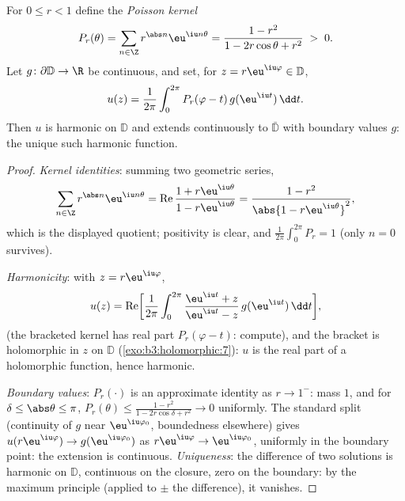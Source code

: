 \begin{theorem}\label{thm:b3:conformal:poisson}
For $0 \leq r < 1$ define the \emph{Poisson
kernel}
\[
P_r(\theta) = \sum_{n\in\Z}r^{\abs n}\eu^{\iu n\theta}
= \frac{1 - r^2}{1 - 2r\cos\theta + r^2} \;>\; 0 .
\]
Let $g \colon \partial\mathbb D \to \R$ be continuous, and
set, for $z = r\eu^{\iu\varphi} \in \mathbb D$,
\[
u(z) = \frac1{2\pi}\int_0^{2\pi}
P_r(\varphi - t)\,g(\eu^{\iu t})\,\dd t .
\]
Then $u$ is harmonic on $\mathbb D$ and extends continuously
to $\bar{\mathbb D}$ with boundary values $g$: the unique such
harmonic function.
\end{theorem}

\begin{proof}
\emph{Kernel identities}: summing two geometric series,
\[
\sum_{n\in\Z}r^{\abs n}\eu^{\iu n\theta}
= \operatorname{Re}\frac{1 + r\eu^{\iu\theta}}{1 -
r\eu^{\iu\theta}}
= \frac{1 - r^2}{\abs{1 - r\eu^{\iu\theta}}^2},
\]
which is the displayed quotient; positivity is clear, and
$\frac1{2\pi}\int_0^{2\pi}P_r = 1$ (only $n = 0$ survives).

\emph{Harmonicity}: with $z = r\eu^{\iu\varphi}$,
\[
u(z) = \operatorname{Re}\biggl[\frac1{2\pi}\int_0^{2\pi}
\frac{\eu^{\iu t} + z}{\eu^{\iu t} - z}\,
g(\eu^{\iu t})\,\dd t\biggr],
\]
(the bracketed kernel has real part $P_r(\varphi - t)$:
compute), and the bracket is holomorphic in $z$ on $\mathbb D$
(\cref{exo:b3:holomorphic:7}): $u$ is the real part of a
holomorphic function, hence harmonic.

\emph{Boundary values}: $P_r(\cdot)$ is an approximate
identity as $r \to 1^-$: mass $1$, and for $\delta \leq
\abs\theta \leq \pi$, $P_r(\theta) \leq \frac{1 - r^2}{1 -
2r\cos\delta + r^2} \to 0$ uniformly. The standard split
(continuity of $g$ near $\eu^{\iu\varphi_0}$, boundedness
elsewhere) gives $u(r\eu^{\iu\varphi}) \to
g(\eu^{\iu\varphi_0})$ as $r\eu^{\iu\varphi} \to
\eu^{\iu\varphi_0}$, uniformly in the boundary point: the
extension is continuous. \emph{Uniqueness}: the difference of
two solutions is harmonic on $\mathbb D$, continuous on the
closure, zero on the boundary: by the maximum principle
(applied to $\pm$ the difference), it vanishes.
\end{proof}

